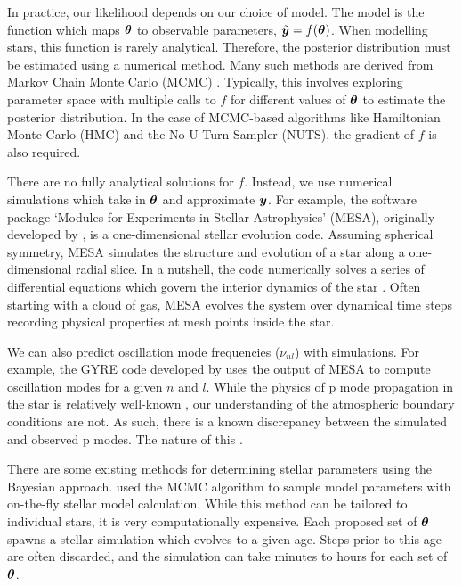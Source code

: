 In practice, our likelihood depends on our choice of model. The model is the function which maps \(\bm{\theta}\) to observable parameters, \(\tilde{\bm{y}} = f(\bm{\theta})\). When modelling stars, this function is rarely analytical. Therefore, the posterior distribution must be estimated using a numerical method. Many such methods are derived from Markov Chain Monte Carlo (MCMC) \needcite. Typically, this involves exploring parameter space with multiple calls to \(f\) for different values of \(\bm{\theta}\) to estimate the posterior distribution. In the case of MCMC-based algorithms like Hamiltonian Monte Carlo (HMC) and the No U-Turn Sampler (NUTS), the gradient of \(f\) is also required.

There are no fully analytical solutions for \(f\). Instead, we use numerical simulations which take in \(\bm{\theta}\) and approximate \(\bm{y}\). For example, the software package `Modules for Experiments in Stellar Astrophysics' (MESA), originally developed by \citet{Paxton.Bildsten.ea2011}, is a one-dimensional stellar evolution code. Assuming spherical symmetry, MESA simulates the structure and evolution of a star along a one-dimensional radial slice. In a nutshell, the code numerically solves a series of differential equations which govern the interior dynamics of the star \citep[see e.g.][]{Kippenhahn.Weigert.ea2013}. Often starting with a cloud of gas, MESA evolves the system over dynamical time steps recording physical properties at mesh points inside the star.

We can also predict oscillation mode frequencies (\(\nu_{nl}\)) with simulations. For example, the GYRE code developed by \citet{Townsend.Teitler2013} uses the output of MESA to compute oscillation modes for a given \(n\) and \(l\). While the physics of p mode propagation in the star is relatively well-known \citep[see e.g.][]{Aerts.Christensen-Dalsgaard.ea2010}, our understanding of the atmospheric boundary conditions are not. As such, there is a known discrepancy between the simulated and observed p modes. The nature of this \citep{Ball.Gizon2014}.

There are some existing methods for determining stellar parameters using the Bayesian approach. \citet{Bazot.Bourguignon.ea2008} used the MCMC algorithm to sample model parameters with on-the-fly stellar model calculation. While this method can be tailored to individual stars, it is very computationally expensive. Each proposed set of \(\bm{\theta}\) spawns a stellar simulation which evolves to a given age. Steps prior to this age are often discarded, and the simulation can take minutes to hours for each set of \(\bm{\theta}\).

